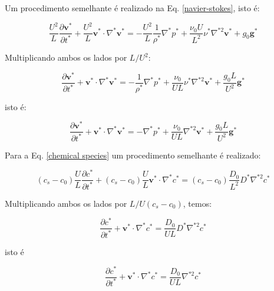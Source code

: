 \medskip
\noindent
Um procedimento semelhante
é realizado na Eq. \ref{navier-stokes}, isto é:

\begin{equation}
 \frac{U^{2}}{L} \frac{\partial \textbf{v$^{*}$}}{\partial t^{*}} 
 + 
 \frac{U^{2}}{L} \textbf{v$^{*}$} \cdot \nabla^{*} \textbf{v$^{*}$}
 =
 -
 \frac{U^{2}}{L} \frac{1}{\rho^{*}} \nabla^{*} p^{*}
 +
 \frac{\nu_{0} U}{L^{2}} \nu^{*} \nabla^{*2} \textbf{v$^{*}$}
 +
 g_{0} \textbf{g$^{*}$}
\end{equation}

\medskip
\noindent
Multiplicando ambos os lados por $L/U^{2}$:

\begin{equation} \label{navier-stokes adimensional 2}
 \frac{\partial \textbf{v$^{*}$}}{\partial t^{*}} 
 + 
 \textbf{v$^{*}$} \cdot \nabla^{*} \textbf{v$^{*}$}
 =
 -
 \frac{1}{\rho^{*}} \nabla^{*} p^{*}
 +
 \frac{\nu_{0}}{UL} \nu^{*} \nabla^{*2} \textbf{v$^{*}$}
 +
 \frac{g_{0}L}{U^{2}} \textbf{g$^{*}$}
\end{equation}

\medskip
\noindent
isto é:

\begin{equation} \label{navier-stokes adimensional 1}
 \frac{\partial \textbf{v$^{*}$}}{\partial t^{*}} 
 + 
 \textbf{v$^{*}$} \cdot \nabla^{*} \textbf{v$^{*}$}
 =
 -
 \nabla^{*} p^{*}
 +
 \frac{\nu_{0}}{UL} \nabla^{*2} \textbf{v$^{*}$}
 +
 \frac{g_{0}L}{U^{2}} \textbf{g$^{*}$}
\end{equation}

\medskip
\noindent
Para a Eq. \ref{chemical species} um procedimento semelhante é
realizado:

\begin{equation}
 (c_{s}-c_{0}) \frac{U}{L} \frac{\partial c^{*}}{\partial t^{*}}
 +
 (c_{s}-c_{0}) \frac{U}{L} \textbf{v$^{*}$} \cdot \nabla^{*} c^{*}
 =
 (c_{s}-c_{0}) \frac{D_{0}}{L^{2}} D^{*} \nabla^{*2} c^{*}
\end{equation}

\medskip
\noindent
Multiplicando ambos os lados por $L/U(c_{s}-c_{0})$, temos:

\begin{equation} \label{especie quimica adimensional 2}
 \frac{\partial c^{*}}{\partial t^{*}}
 +
 \textbf{v$^{*}$} \cdot \nabla^{*} c^{*}
 =
 \frac{D_{0}}{UL} D^{*} \nabla^{*2} c^{*}
\end{equation}

\medskip
\noindent
isto é

\begin{equation} \label{especie quimica adimensional 1}
 \frac{\partial c^{*}}{\partial t^{*}}
 +
 \textbf{v$^{*}$} \cdot \nabla^{*} c^{*}
 =
 \frac{D_{0}}{UL} \nabla^{*2} c^{*}
\end{equation}

